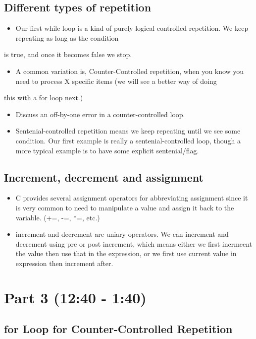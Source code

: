 \documentclass[11pt]{article}
\begin{document}
\subsection{Different types of repetition}
\label{sec-2-5}

\begin{itemize}
\item Our first while loop is a kind of purely logical controlled repetition.  We keep repeating as long as the condition
\end{itemize}
is true, and once it becomes false we stop.
\begin{itemize}
\item A common variation is, Counter-Controlled repetition, when you know you need to process X specific items (we will see a better way of doing
\end{itemize}
this with a for loop next.)
\begin{itemize}
\item Discuss an off-by-one error in a counter-controlled loop.
\item Sentenial-controlled repetition means we keep repeating until we see
  some condition.  Our first example is really a sentenial-controlled
  loop, though a more typical example is to have some explicit
  sentenial/flag.
\end{itemize}
\subsection{Increment, decrement and assignment}
\label{sec-2-6}

\begin{itemize}
\item C provides several assignment operators for abbreviating
  assignment since it is very common to need to manipulate a value and
  assign it back to the variable. (+=, -=, *=, etc.)
\item increment and decrement are uniary operators.  We can increment and
  decrement using pre or post increment, which means either we first
  incrmeent the value then use that in the expression, or we first use
  current value in expression then increment after.
\end{itemize}
\section{Part 3 (12:40 - 1:40)}
\label{sec-3}
\subsection{for Loop for Counter-Controlled Repetition}
\label{sec-3-1}
\end{document}
